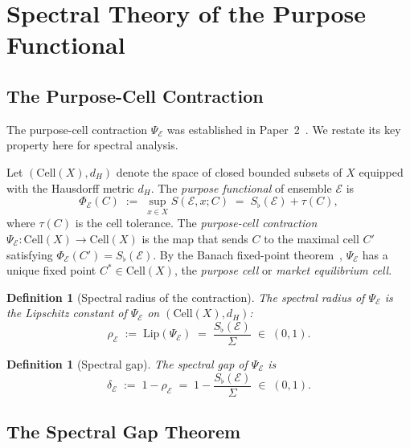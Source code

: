 \documentclass[twocolumn,11pt,a4paper]{article}
\newtheorem{definition}[theorem]{Definition}
\theoremstyle{remark}
\newcommand{\Sflat}{S_{\flat}}
\newcommand{\tol}{\tau}
\newcommand{\Ens}{\mathcal{E}}
\newcommand{\srad}{\rho}                  %
\newcommand{\sgap}{\delta}                %
\begin{document}
\section{Spectral Theory of the Purpose Functional}
\label{sec:spectral}

\subsection{The Purpose-Cell Contraction}
\label{sec:spectral:contraction}

The purpose-cell contraction $\Psi_\Ens$ was established in
Paper~2~\cite{sachikonye2025market}.  We restate its key property here for
spectral analysis.

Let $(\mathrm{Cell}(X), d_H)$ denote the space of closed bounded subsets of $X$
equipped with the Hausdorff metric $d_H$.  The \emph{purpose functional} of
ensemble $\Ens$ is
\[
  \Phi_\Ens(C) \;:=\; \sup_{x \in X} S(\Ens, x; C)
  \;=\; \Sflat(\Ens) + \tol(C),
\]
where $\tol(C)$ is the cell tolerance.  The \emph{purpose-cell contraction}
$\Psi_\Ens: \mathrm{Cell}(X) \to \mathrm{Cell}(X)$ is the map that sends $C$
to the maximal cell $C'$ satisfying $\Phi_\Ens(C') = \Sflat(\Ens)$.  By
the Banach fixed-point theorem~\cite{sachikonye2025market}, $\Psi_\Ens$
has a unique fixed point $C^* \in \mathrm{Cell}(X)$, the \emph{purpose cell}
or \emph{market equilibrium cell}.

\begin{definition}[Spectral radius of the contraction]
\label{def:spectral-radius}
The \emph{spectral radius} of $\Psi_\Ens$ is the Lipschitz constant of
$\Psi_\Ens$ on $(\mathrm{Cell}(X), d_H)$:
\[
  \srad_\Ens \;:=\; \mathrm{Lip}(\Psi_\Ens)
  \;=\; \frac{\Sflat(\Ens)}{\Sigma} \;\in\; (0,1).
\]
\end{definition}

\begin{definition}[Spectral gap]
\label{def:spectral-gap}
The \emph{spectral gap} of $\Psi_\Ens$ is
\[
  \sgap_\Ens \;:=\; 1 - \srad_\Ens \;=\; 1 - \frac{\Sflat(\Ens)}{\Sigma}
  \;\in\; (0,1).
\]
\end{definition}

\subsection{The Spectral Gap Theorem}
\label{sec:spectral:gap-thm}
\end{document}
